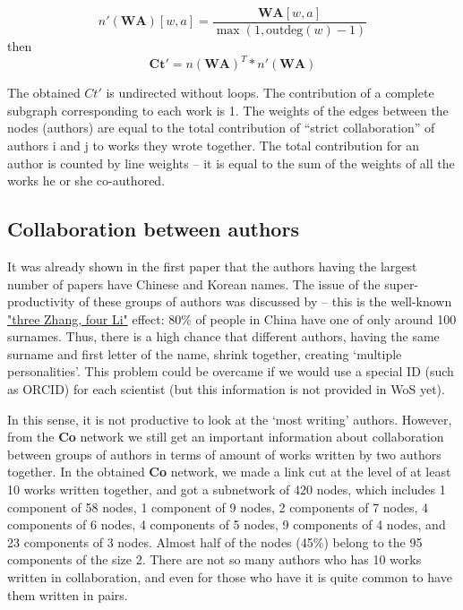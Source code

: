 \documentclass[11pt]{article} %
\begin{document}
\[ n'(\mathbf{WA})[w,a] = \frac{\mathbf{WA}[w,a]}{\max(1,\textrm{outdeg}(w)-1)}\]
then 
\[ \mathbf{Ct'} = n(\mathbf{WA})^T * n'(\mathbf{WA}) \] 

The obtained $Ct'$ is undirected without loops. The contribution of a complete subgraph corresponding to each work is 1. The weights of the edges between the nodes (authors) are equal to the total contribution of “strict collaboration” of authors i and j to works they wrote together. The total contribution for an author is counted by line weights -- it is equal to the sum of the weights of all the works he or she co-authored.  \medskip 

\subsection{Collaboration between authors}  

It was already shown in the first paper that the authors having the largest number of papers have Chinese and Korean names. The issue of the super-productivity of these groups of authors was discussed by \cite{harzing2015} -- this is the well-known \href{https://en.wikipedia.org/wiki/List_of_common_Chinese_surnames}{"three Zhang, four Li"} effect: 80\% of people in China have one of only around 100 surnames. Thus, there is a high chance that different authors, having the same surname and first letter of the name, shrink together, creating `multiple personalities'. This problem could be overcame if we would use a special ID (such as ORCID) for each scientist (but this information is not provided in WoS yet).  \medskip 

In this sense, it is not productive to look at the `most writing' authors. However, from the \textbf{Co} network we still get an important information about collaboration between groups of authors in terms of amount of works written by two authors together. In the obtained \textbf{Co} network, we made a link cut  at the level of at least 10 works written together, and got a subnetwork of 420 nodes, which includes 1 component of 58 nodes, 1 component of 9 nodes, 2 components of 7 nodes, 4 components of 6 nodes, 4 components of 5 nodes, 9 components of 4 nodes, and 23 components of 3 nodes. Almost half of the nodes (45\%) belong to the 95 components of the size 2. There are not so many authors who has 10 works written in collaboration, and even for those who have it is quite common to have them written in pairs. \medskip 
\end{document}
